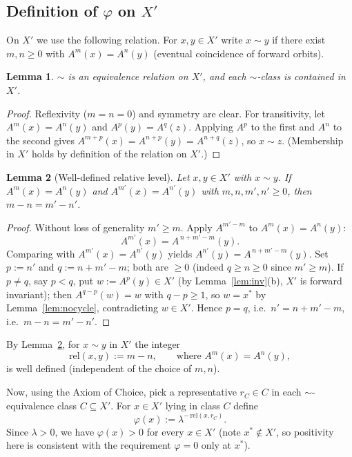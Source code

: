 \documentclass{amsart}
\newtheorem{lemma}{Lemma}
\theoremstyle{definition}
\begin{document}
\subsection*{Definition of $\varphi$ on $X'$}
On $X'$ we use the following relation. For $x,y\in X'$ write $x\sim y$ if there
exist $m,n\ge 0$ with $A^m(x)=A^n(y)$ (eventual coincidence of forward orbits).

\begin{lemma}\label{lem:equiv}
$\sim$ is an equivalence relation on $X'$, and each $\sim$-class is contained in
$X'$.
\end{lemma}
\begin{proof}
Reflexivity ($m=n=0$) and symmetry are clear. For transitivity, let
$A^{m}(x)=A^{n}(y)$ and $A^{p}(y)=A^{q}(z)$. Applying $A^{p}$ to the first and
$A^{n}$ to the second gives $A^{m+p}(x)=A^{n+p}(y)=A^{n+q}(z)$, so $x\sim z$.
(Membership in $X'$ holds by definition of the relation on $X'$.)
\end{proof}

\begin{lemma}[Well-defined relative level]\label{lem:delta}
Let $x,y\in X'$ with $x\sim y$. If $A^m(x)=A^n(y)$ and $A^{m'}(x)=A^{n'}(y)$ with
$m,n,m',n'\ge 0$, then $m-n=m'-n'$.
\end{lemma}
\begin{proof}
Without loss of generality $m'\ge m$. Apply $A^{m'-m}$ to $A^m(x)=A^n(y)$:
\[
  A^{m'}(x)=A^{\,n+m'-m}(y).
\]
Comparing with $A^{m'}(x)=A^{n'}(y)$ yields
$A^{n'}(y)=A^{\,n+m'-m}(y)$. Set $p:=n'$ and $q:=n+m'-m$; both are $\ge 0$ (indeed
$q\ge n\ge0$ since $m'\ge m$). If $p\ne q$, say $p<q$, put $w:=A^{p}(y)\in X'$ (by
Lemma~\ref{lem:inv}(b), $X'$ is forward invariant); then $A^{q-p}(w)=w$ with
$q-p\ge 1$, so $w=x^*$ by Lemma~\ref{lem:nocycle}, contradicting $w\in X'$. Hence
$p=q$, i.e.\ $n'=n+m'-m$, i.e.\ $m-n=m'-n'$.
\end{proof}

By Lemma~\ref{lem:delta}, for $x\sim y$ in $X'$ the integer
\begin{equation}\label{eq:rel}
  \mathrm{rel}(x,y):=m-n,\qquad\text{where }A^m(x)=A^n(y),
\end{equation}
is well defined (independent of the choice of $m,n$).

Now, using the Axiom of Choice, pick a representative $r_C\in C$ in each
$\sim$-equivalence class $C\subseteq X'$. For $x\in X'$ lying in class $C$ define
\begin{equation}\label{eq:phiXp}
  \varphi(x):=\lambda^{-\,\mathrm{rel}(x,r_C)} .
\end{equation}
Since $\lambda>0$, we have $\varphi(x)>0$ for every $x\in X'$ (note $x^*\notin
X'$, so positivity here is consistent with the requirement $\varphi=0$ only at
$x^*$).
\end{document}
